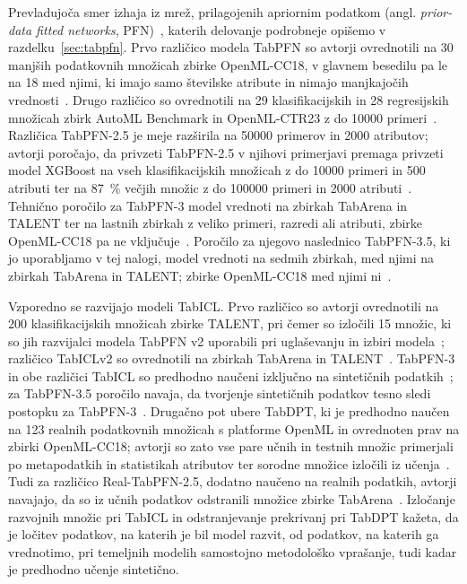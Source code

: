 \documentclass[a4paper,12pt,openright]{book}
\begin{document}
Prevladujoča smer izhaja iz mrež, prilagojenih apriornim podatkom (angl.
\emph{prior-data fitted networks}, PFN)~\cite{muller2022transformers}, katerih
delovanje podrobneje opišemo v razdelku~\ref{sec:tabpfn}. Prvo različico
modela TabPFN so avtorji ovrednotili na 30 manjših podatkovnih množicah zbirke
OpenML-CC18, v glavnem besedilu pa le na 18 med njimi, ki imajo samo številske
atribute in nimajo manjkajočih vrednosti~\cite{hollmann2023tabpfn}. Drugo
različico so ovrednotili na 29 klasifikacijskih in 28 regresijskih množicah
zbirk AutoML Benchmark in OpenML-CTR23 z do \num{10000}
primeri~\cite{hollmann2025tabpfn}. Različica TabPFN-2.5 je meje razširila na
\num{50000} primerov in 2000 atributov; avtorji poročajo, da privzeti
TabPFN-2.5 v njihovi primerjavi premaga privzeti model XGBoost na vseh
klasifikacijskih množicah z do \num{10000} primeri in 500 atributi ter na
\SI{87}{\percent} večjih množic z do \num{100000} primeri in 2000
atributi~\cite{grinsztajn2025tabpfn25}. Tehnično poročilo za TabPFN-3 model
vrednoti na zbirkah TabArena in TALENT ter na lastnih zbirkah z veliko
primeri, razredi ali atributi, zbirke OpenML-CC18 pa ne
vključuje~\cite{grinsztajn2026tabpfn3}. Poročilo za njegovo naslednico
TabPFN-3.5, ki jo uporabljamo v tej nalogi, model vrednoti na sedmih zbirkah,
med njimi na zbirkah TabArena in TALENT; zbirke OpenML-CC18 med njimi
ni~\cite{jager2026tabpfn35}.

Vzporedno se razvijajo modeli TabICL. Prvo različico so avtorji ovrednotili na
200 klasifikacijskih množicah zbirke TALENT, pri čemer so izločili 15 množic,
ki so jih razvijalci modela TabPFN v2 uporabili pri uglaševanju in izbiri
modela~\cite{qu2025tabicl}; različico TabICLv2 so ovrednotili na zbirkah
TabArena in TALENT~\cite{qu2026tabiclv2}. TabPFN-3 in obe različici TabICL so
predhodno naučeni izključno na sintetičnih
podatkih~\cite{grinsztajn2026tabpfn3,qu2025tabicl,qu2026tabiclv2}; za TabPFN-3.5
poročilo navaja, da tvorjenje sintetičnih podatkov tesno sledi postopku za
TabPFN-3~\cite{jager2026tabpfn35}. Drugačno
pot ubere TabDPT, ki je predhodno naučen na 123 realnih podatkovnih množicah s
platforme OpenML in ovrednoten prav na zbirki OpenML-CC18; avtorji so zato vse
pare učnih in testnih množic primerjali po metapodatkih in statistikah
atributov ter sorodne množice izločili iz učenja~\cite{ma2025tabdpt}. Tudi za
različico Real-TabPFN-2.5, dodatno naučeno na realnih podatkih, avtorji
navajajo, da so iz učnih podatkov odstranili množice zbirke
TabArena~\cite{grinsztajn2025tabpfn25}. Izločanje razvojnih množic pri TabICL
in odstranjevanje prekrivanj pri TabDPT kažeta, da je ločitev podatkov, na
katerih je bil model razvit, od podatkov, na katerih ga vrednotimo, pri
temeljnih modelih samostojno metodološko vprašanje, tudi kadar je predhodno
učenje sintetično.
\end{document}
